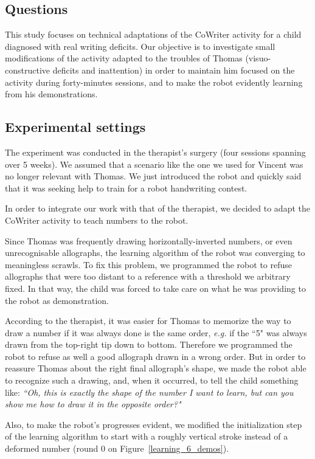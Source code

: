 \documentclass{sig-alternate}
\begin{document}
\subsection{Questions}
This study focuses on technical adaptations of the CoWriter activity for a 
child diagnosed with real writing deficits.
Our objective is to investigate small modifications of the activity adapted to
the troubles of Thomas (visuo-constructive deficits and inattention) in order to
maintain him focused
on the activity during forty-minutes sessions, and to make the robot
evidently learning from his demonstrations.

\subsection{Experimental settings}
The experiment was conducted in the therapist's surgery  (four sessions 
spanning over 5 weeks). We assumed that a scenario like the one we used 
for Vincent was no longer relevant with Thomas. We just introduced the robot 
and quickly said that it was seeking help to train for a robot handwriting contest.

In order to integrate our work with that of the therapist, we decided to adapt the 
CoWriter activity to teach numbers to the robot.

Since Thomas was frequently drawing horizontally-inverted numbers, or even
unrecognisable allographs, the learning algorithm of the robot was converging to
meaningless scrawls. To fix this problem, we programmed the robot to refuse allographs that
were too distant to a reference with a threshold we arbitrary fixed. In that way,
the child was forced to take care on what he was providing to the robot as
demonstration. 

According to the therapist, it was easier for Thomas to memorize the way to draw
a number if it was always done is the same order, \emph{e.g.} if the ``5" was always
drawn from the top-right tip down to bottom. Therefore we programmed the robot to
refuse as well a good allograph drawn in a wrong order. But in order to reassure Thomas
about the right final allograph's shape, we made the robot able to recognize
such a drawing, and, when it occurred, to tell the child something like:
\emph{``Oh, this is exactly the shape of the number I want to learn, but can you
show me how to draw it in the opposite order?"}

Also, to make
the robot's progresses evident, we modified the initialization step of the
learning algorithm to start with a roughly vertical stroke instead of a
deformed number (round 0 on Figure~\ref{learning_6_demos}).
\end{document}
